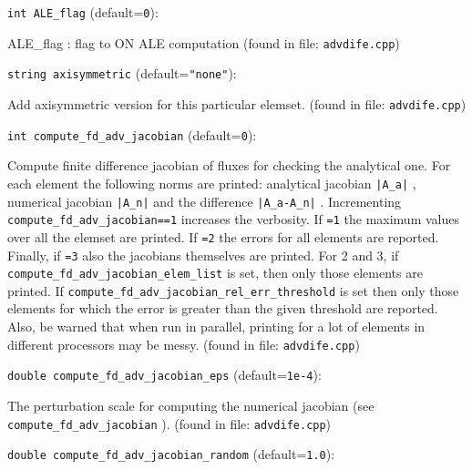 \item\verb+int ALE_flag+ {\rm(default=\verb|0|)}:

ALE_flag : flag to ON ALE computation
 (found in file: \verb+advdife.cpp+)
\item\verb+string axisymmetric+ {\rm(default=\verb|"none"|)}:

Add axisymmetric version for this particular elemset.
 (found in file: \verb+advdife.cpp+)
\item\verb+int compute_fd_adv_jacobian+ {\rm(default=\verb|0|)}:

Compute finite difference jacobian of fluxes for checking the
 analytical one. For each element the following norms are printed:
 analytical jacobian \verb+|A_a|+ , numerical jacobian \verb+|A_n|+ and the
 difference \verb+|A_a-A_n|+ . Incrementing \verb+compute_fd_adv_jacobian==1+
 increases the verbosity. If \verb+=1+ the maximum values over all the
 elemset are printed. If \verb+=2+ the errors for all elements are
 reported. Finally, if \verb+=3+ also the jacobians themselves are
 printed. For 2 and 3, if \verb+compute_fd_adv_jacobian_elem_list+ is
 set, then only those elements are printed. If
 \verb+compute_fd_adv_jacobian_rel_err_threshold+ is set then only those
 elements for which the error is greater than the given threshold
 are reported.  Also, be warned that when run in parallel, printing
 for a lot of elements in different processors may be messy.
 (found in file: \verb+advdife.cpp+)
\item\verb+double compute_fd_adv_jacobian_eps+ {\rm(default=\verb|1e-4|)}:

The perturbation scale for computing the numerical jacobian
 (see \verb+compute_fd_adv_jacobian+ ).
 (found in file: \verb+advdife.cpp+)
\item\verb+double compute_fd_adv_jacobian_random+ {\rm(default=\verb|1.0|)}:

